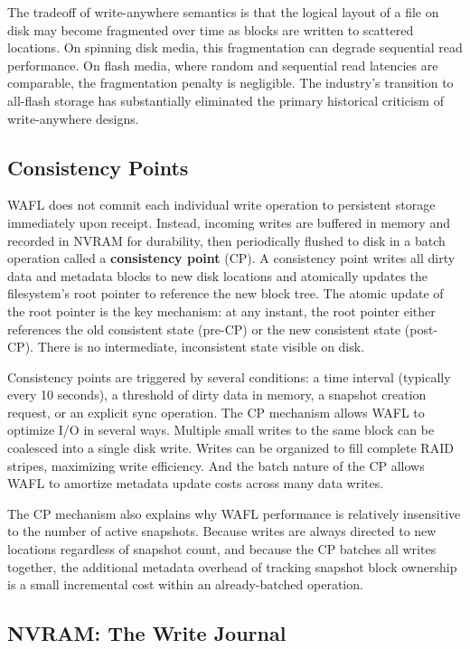 The tradeoff of write-anywhere semantics is that the logical layout of a file on disk may become fragmented over time as blocks are written to scattered locations. On spinning disk media, this fragmentation can degrade sequential read performance. On flash media, where random and sequential read latencies are comparable, the fragmentation penalty is negligible. The industry's transition to all-flash storage has substantially eliminated the primary historical criticism of write-anywhere designs.

\subsection{Consistency Points}

WAFL does not commit each individual write operation to persistent storage immediately upon receipt. Instead, incoming writes are buffered in memory and recorded in NVRAM for durability, then periodically flushed to disk in a batch operation called a \textbf{consistency point} (CP). A consistency point writes all dirty data and metadata blocks to new disk locations and atomically updates the filesystem's root pointer to reference the new block tree. The atomic update of the root pointer is the key mechanism: at any instant, the root pointer either references the old consistent state (pre-CP) or the new consistent state (post-CP). There is no intermediate, inconsistent state visible on disk.

Consistency points are triggered by several conditions: a time interval (typically every 10 seconds), a threshold of dirty data in memory, a snapshot creation request, or an explicit sync operation. The CP mechanism allows WAFL to optimize I/O in several ways. Multiple small writes to the same block can be coalesced into a single disk write. Writes can be organized to fill complete RAID stripes, maximizing write efficiency. And the batch nature of the CP allows WAFL to amortize metadata update costs across many data writes.

The CP mechanism also explains why WAFL performance is relatively insensitive to the number of active snapshots. Because writes are always directed to new locations regardless of snapshot count, and because the CP batches all writes together, the additional metadata overhead of tracking snapshot block ownership is a small incremental cost within an already-batched operation.

\subsection{NVRAM: The Write Journal}

